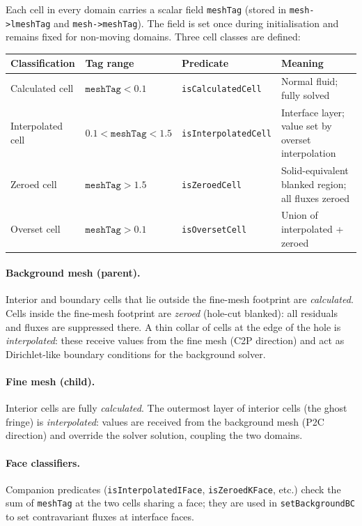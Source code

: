 \documentclass[12pt,a4paper]{article}
\begin{document}
Each cell in every domain carries a scalar field \texttt{meshTag}
(stored in \texttt{mesh->lmeshTag} and \texttt{mesh->meshTag}).
The field is set once during initialisation and remains fixed for
non-moving domains.  Three cell classes are defined:

\begin{center}
\begin{tabular}{llll}
\toprule
\textbf{Classification} & \textbf{Tag range} & \textbf{Predicate} & \textbf{Meaning} \\
\midrule
Calculated cell & $\texttt{meshTag} < 0.1$       & \texttt{isCalculatedCell} & Normal fluid; fully solved \\
Interpolated cell & $0.1 < \texttt{meshTag} < 1.5$ & \texttt{isInterpolatedCell} & Interface layer; value set by overset interpolation \\
Zeroed cell       & $\texttt{meshTag} > 1.5$       & \texttt{isZeroedCell}        & Solid-equivalent blanked region; all fluxes zeroed \\
\midrule
Overset cell      & $\texttt{meshTag} > 0.1$       & \texttt{isOversetCell}       & Union of interpolated + zeroed \\
\bottomrule
\end{tabular}
\end{center}

\paragraph{Background mesh (parent).}
Interior and boundary cells that lie outside the fine-mesh footprint are
\emph{calculated}.  Cells inside the fine-mesh footprint are \emph{zeroed}
(hole-cut blanked): all residuals and fluxes are suppressed there.
A thin collar of cells at the edge of the hole is \emph{interpolated}:
these receive values from the fine mesh (C2P direction) and act as
Dirichlet-like boundary conditions for the background solver.

\paragraph{Fine mesh (child).}
Interior cells are fully \emph{calculated}.
The outermost layer of interior cells (the ghost fringe) is
\emph{interpolated}: values are received from the background mesh (P2C
direction) and override the solver solution, coupling the two domains.

\paragraph{Face classifiers.}
Companion predicates (\texttt{isInterpolatedIFace}, \texttt{isZeroedKFace},
etc.) check the sum of \texttt{meshTag} at the two cells sharing a face;
they are used in \texttt{setBackgroundBC} to set contravariant fluxes at
interface faces.
\end{document}

